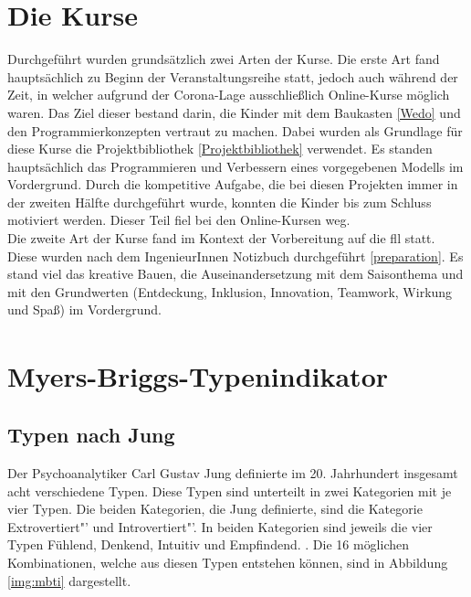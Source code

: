 \section{Die Kurse}
Durchgeführt wurden grundsätzlich zwei Arten der Kurse. Die erste Art fand hauptsächlich zu Beginn der Veranstaltungsreihe statt, jedoch auch während der Zeit, in welcher aufgrund der Corona-Lage ausschließlich Online-Kurse möglich waren. Das Ziel dieser bestand darin, die Kinder mit dem Baukasten \ref{Wedo} und den Programmierkonzepten vertraut zu machen. Dabei wurden als Grundlage für diese Kurse die Projektbibliothek \ref{Projektbibliothek} verwendet. Es standen hauptsächlich das Programmieren und Verbessern eines vorgegebenen Modells im Vordergrund. Durch die kompetitive Aufgabe, die bei diesen Projekten immer in der zweiten Hälfte durchgeführt wurde, konnten die Kinder bis zum Schluss motiviert werden. Dieser Teil fiel bei den Online-Kursen weg.\\
Die zweite Art der Kurse fand im Kontext der Vorbereitung auf die \acrlong{fll} statt. Diese wurden nach dem IngenieurInnen Notizbuch durchgeführt \ref{preparation}. Es stand viel das kreative Bauen, die Auseinandersetzung mit dem Saisonthema und mit den Grundwerten (Entdeckung, Inklusion, Innovation, Teamwork, Wirkung und Spaß) im Vordergrund. 





\section{Myers-Briggs-Typenindikator\textsuperscript{\textregistered}} 
\subsection{Typen nach Jung}
Der Psychoanalytiker Carl Gustav Jung definierte im 20. Jahrhundert insgesamt acht verschiedene Typen. Diese Typen sind unterteilt in zwei Kategorien mit je vier Typen. Die beiden Kategorien, die Jung definierte, sind die Kategorie \glqq Extrovertiert"' und \glqq Introvertiert"'. In beiden Kategorien sind jeweils die vier Typen Fühlend, Denkend, Intuitiv und Empfindend. \cite{jung_1921}. Die 16 möglichen Kombinationen, welche aus diesen Typen entstehen können, sind in Abbildung \ref{img:mbti} dargestellt.\\

